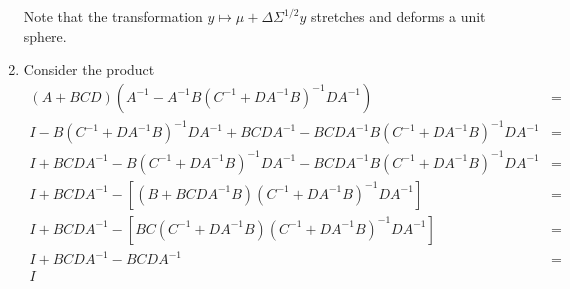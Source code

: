 \begin{enumerate}
Note that the transformation $y \mapsto \mu + \Delta\Sigma^{1/2}y$ stretches and deforms a
unit sphere.

\item Consider the product
\begin{eqnarray*}
(A + BCD)(A^{-1} - A^{-1}B(C^{-1} + DA^{-1}B)^{-1}DA^{-1}) &=& \\
I - B(C^{-1} + DA^{-1}B)^{-1}DA^{-1} + BCDA^{-1} - BCDA^{-1}B(C^{-1} + DA^{-1}B)^{-1}DA^{-1} &=& \\
I + BCDA^{-1} - B(C^{-1} + DA^{-1}B)^{-1}DA^{-1} - BCDA^{-1}B(C^{-1} + DA^{-1}B)^{-1}DA^{-1} &=& \\
I + BCDA^{-1} - \left[(B + BCDA^{-1}B)(C^{-1} + DA^{-1}B)^{-1}DA^{-1}\right] &=& \\
I + BCDA^{-1} - \left[BC(C^{-1} + DA^{-1}B)(C^{-1} + DA^{-1}B)^{-1}DA^{-1}\right] &=& \\
I + BCDA^{-1} - BCDA^{-1} &=& \\
I
\end{eqnarray*}


\end{enumerate}

